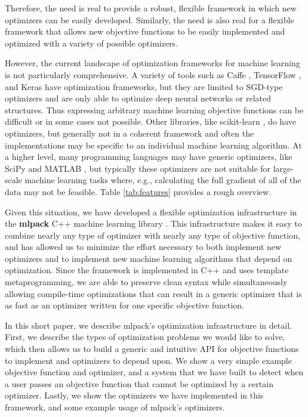 \documentclass{article}
\begin{document}
Therefore, the need is real to provide a robust, flexible framework in which
new optimizers can be easily developed.  Similarly, the need is also real for a
flexible framework that allows new objective functions to be easily implemented
and optimized with a variety of possible optimizers.

However, the current landscape of optimization frameworks for machine learning
is not particularly comprehensive.  A variety of tools such as
Caffe \cite{jia2014caffe},
TensorFlow \cite{abadi2016tensorflow},
and
Keras \cite{chollet2015}
have optimization frameworks, but they are limited to SGD-type optimizers and
are only able to optimize deep neural networks or related structures.  Thus
expressing arbitrary machine learning objective functions can be difficult or in
some cases not possible.  Other libraries, like
scikit-learn \cite{pedregosa2011scikit},
do have optimizers, but generally not in a coherent framework and
often the implementations may be specific to an individual machine learning
algorithm.  At a higher level, many programming languages may have generic
optimizers, like SciPy \cite{jones2014scipy} and MATLAB \cite{mathworks2017OTB}, but typically these
optimizers are not suitable for large-scale machine learning tasks where, e.g.,
calculating the full gradient of all of the data may not be feasible.  Table
\ref{tab:features} provides a rough overview.

Given this situation, we have developed a flexible optimization infrastructure
in the {\bf mlpack} C++ machine learning library \cite{mlpack2013}.  This
infrastructure makes it easy to combine nearly any type of optimizer with nearly
any type of objective function, and has allowed us to minimize the effort
necessary to both implement new optimizers and to implement new machine learning
algorithms that depend on optimization.  Since the framework is implemented in
C++ and uses template metaprogramming, we are able to preserve clean syntax
while simultaneously allowing compile-time optimizations that can result in a
generic optimizer that is as fast as an optimizer written for one specific objective function.

In this short paper, we describe mlpack's optimization infrastructure in detail.
First, we describe the types of optimization problems we would like to solve,
which then allows us to build a generic and intuitive API for objective
functions to implement and optimizers to depend upon.  We show a very simple
example objective function and optimizer, and a system that we have built to
detect when a user passes an objective function that cannot be optimized by a
certain optimizer.  Lastly, we show the optimizers we have implemented in this
framework, and some example usage of mlpack's optimizers.
\end{document}
